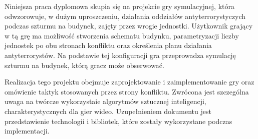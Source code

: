 Niniejsza praca dyplomowa skupia się na projekcie gry symulacyjnej, która odwzorowuje, w dużym uproszczeniu, działania oddziałów antyterrorystyczych podczas szturmu na budynek, zajęty przez wrogie jednostki. Użytkownik grający w tą grę ma możliwość stworzenia schematu budynku, parametryzacji liczby jednostek po obu stronach konfliktu oraz określenia planu działania antyterrorystów. Na podstawie tej konfiguracji gra przeprowadza symulację szturmu na budynek, którą gracz może obserwować.

Realizacja tego projektu obejmuje zaprojektowanie i zaimplementowanie gry oraz omówienie taktyk stosowanych przez strony konfliktu. Zwrócona jest szczególna uwaga na twórcze wykorzystaie algorytmów sztucznej inteligencji, charakterystycznych dla gier wideo. Uzupełnieniem dokumentu jest przedstawienie technologii i bibliotek, które zostały wykorzystane podczas implementacji.


